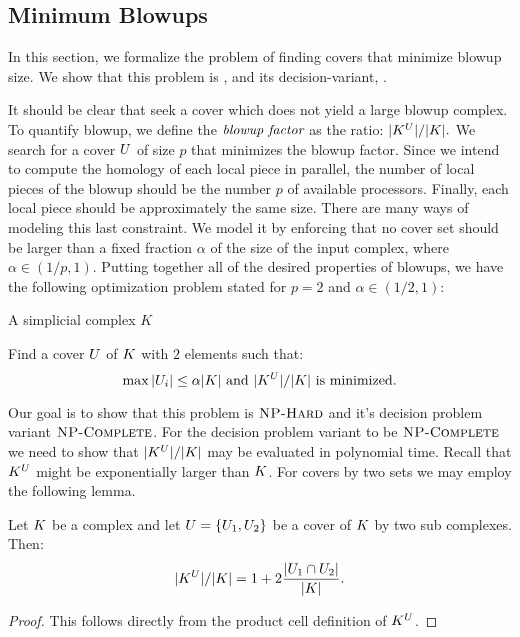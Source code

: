 \documentclass{jocg}
\begin{document}
\subsection{Minimum Blowups}
\label{sec:hardness}
In this section, we formalize the problem of finding covers
that minimize blowup size. We show that this problem is \NPH{}, and its 
decision-variant, \NPC{}.

It should be clear that seek a cover which does not yield a large blowup complex. 
To quantify blowup, we define the $\emph{blowup factor}$ as the ratio: 
$|K^{U}|/|K|.$ We search for a cover $U$ of size $p$ that minimizes the blowup 
factor. Since we intend to compute the homology of each local piece in parallel,
 the number of local pieces of the blowup should be the number $p$ of available 
processors. Finally, each local piece should be approximately the same 
size. There are many ways of modeling this last constraint. 
We model it by enforcing that no cover set should be larger than a fixed fraction
$\alpha$ of the size of the input complex, where $\alpha \in (1/p,1)$. 
Putting together all of the desired properties of blowups, we have the following 
optimization problem stated for $p = 2$ and $\alpha \in (1/2, 1)$:
\begin{description}
\addtolength{\itemsep}{-.7\baselineskip}
\item[\textsc{Problem:}]  \ablp 
\item[\textsc{Instance:}] A simplicial complex $K$
\item[\textsc{Goal:}] Find a cover $U$ of $K$ with $2$ elements such that: 
\[ \max{|U_i|} \leq \alpha|K| \textrm{ and } |K^{U}|/|K| \textrm{ is minimized.} \]
\end{description}
Our goal is to show that this problem is $\textsc{NP-Hard}{}$ and it's decision problem variant $\textsc{NP-Complete}{}$.
For the decision problem variant to be $\textsc{NP-Complete}{}$ we need to show that $|K^{U}|/|K|$ may
be evaluated in polynomial time. Recall that $K^{U}$ might be exponentially larger than $K$. 
For covers by two sets we may employ the following lemma.
\begin{lemma}
\label{lem:char-blowup-sol}
Let $K$ be a complex and let $U = \{U_1, U_2\}$ be a cover of $K$ 
by two sub complexes. Then:
\begin{equation*}
|K^{U}|/|K| = 1 + 2\frac{|U_1 \cap U_2|}{|K|}. 
\end{equation*}
\end{lemma}
\begin{proof}
This follows directly from the product cell definition of $K^U$.
\end{proof}
\end{document}
